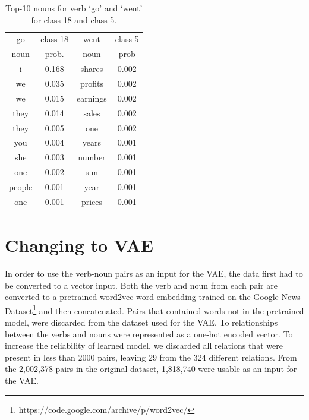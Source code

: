 \documentclass[11pt]{scrartcl}
\begin{document}
  \begin{table}
    \centering
\begin{tabular}{c c c c}
\toprule
go & class 18 & went & class 5 \\
noun & prob. & noun & prob \\
\midrule
i & 0.168        & shares & 0.002 \\
we & 0.035       & profits & 0.002 \\
we & 0.015       & earnings & 0.002 \\
they & 0.014     & sales & 0.002 \\
they & 0.005     & one & 0.002 \\
you & 0.004      & years & 0.001 \\
she & 0.003      & number & 0.001 \\
one & 0.002      & sun & 0.001 \\
people & 0.001   & year & 0.001 \\
one & 0.001      & prices & 0.001 \\
\bottomrule
\end{tabular}
\caption{Top-10 nouns for verb `go' and `went' for class 18 and class 5.}
\label{table:topnoun}
\end{table}

\section{Changing to VAE} %
In order to use the verb-noun pairs as an input for the VAE, the data first had to be converted to a vector input. Both the verb and noun from each pair are converted to a pretrained word2vec\cite{mikolov2013efficient} word embedding trained on the Google News Dataset\footnote{https://code.google.com/archive/p/word2vec/} and then concatenated. Pairs that contained words not in the pretrained model, were discarded from the dataset used for the VAE. To relationships between the verbs and nouns were represented as a one-hot encoded vector. To increase the reliability of learned model, we discarded all relations that were present in less than 2000 pairs, leaving 29 from the 324 different relations. From the 2,002,378 pairs in the original dataset, 1,818,740 were usable as an input for the VAE.  


\end{document}
